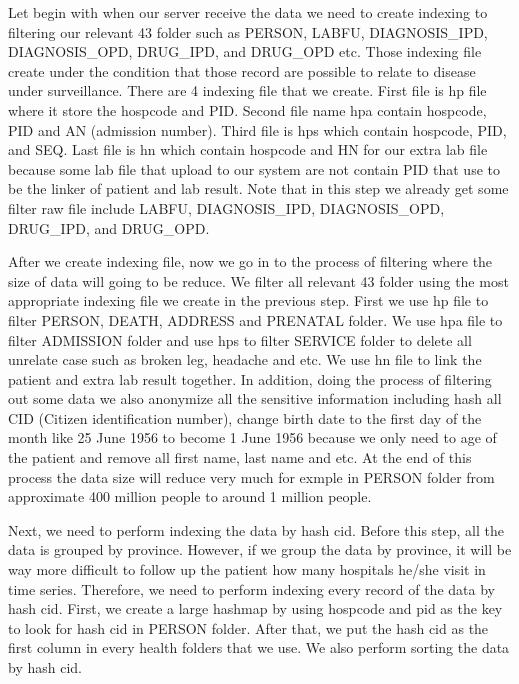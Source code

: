         Let begin with when our server receive the data we need to create indexing to filtering our relevant 43 folder such as PERSON, LABFU, DIAGNOSIS{\_}IPD, DIAGNOSIS{\_}OPD, DRUG{\_}IPD, and DRUG{\_}OPD etc. Those indexing file create under the condition that those record are possible to relate to disease under surveillance. There are 4 indexing file that we create. First file is hp file where it store the hospcode and PID. Second file name hpa contain hospcode, PID and AN (admission number). Third file is hps which contain hospcode, PID, and SEQ. Last file is hn which contain hospcode and HN for our extra lab file because some lab file that upload to our system are not contain PID that use to be the linker of patient and lab result. Note that in this step we already get some filter raw file include LABFU, DIAGNOSIS{\_}IPD, DIAGNOSIS{\_}OPD, DRUG{\_}IPD, and DRUG{\_}OPD.
        
        After we create indexing file, now we go in to the process of filtering where the size of data will going to be reduce. We filter all relevant 43 folder using the most appropriate indexing file we create in the previous step. First we use hp file to filter PERSON, DEATH, ADDRESS and PRENATAL folder. We use hpa file to filter ADMISSION folder and use hps to filter SERVICE folder to delete all unrelate case such as broken leg, headache and etc. We use hn file to link the patient and extra lab result together.
        In addition, doing the process of filtering out some data we also anonymize all the sensitive information including hash all CID (Citizen identification number), change birth date to the first day of the month like 25 June 1956 to become 1 June 1956 because we only need to age of the patient and remove all first name, last name and etc. At the end of this process the data size will reduce very much for exmple in PERSON folder from approximate 400 million people to around 1 million people.
        
        Next, we need to perform indexing the data by hash cid. Before this step, all the data is grouped by province. However, if we group the data by province, it will be way more difficult to follow up the patient how many hospitals he/she visit in time series. Therefore, we need to perform indexing every record of the data by hash cid. First, we create a large hashmap by using hospcode and pid as the key to look for hash cid in PERSON folder. After that, we put the hash cid as the first column in every health folders that we use. We also perform sorting the data by hash cid.

